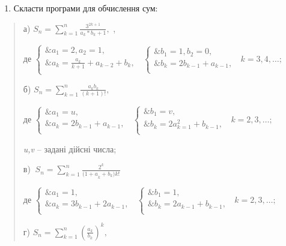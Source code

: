 \documentclass[]{article}
\begin{document}
\begin{enumerate}
\def\labelenumi{\arabic{enumi})}
\item
  \protect\hypertarget{_Hlk65241776}{}{}Скласти програми для обчислення
  сум:
\end{enumerate}

\begin{quote}
а) \(S_{n} = \sum_{k = 1}^{n}\frac{3^{2k + 1}}{a_{k}*b_{k} + 1},\) ,

де \(\left\{ \begin{matrix}
\& a_{1} = 2,a_{2} = 1, \\
\& a_{k} = \frac{a_{k}}{k + 1} + a_{k - 2} + b_{k}, \\
\end{matrix} \right.\ \) \(\left\{ \begin{matrix}
\& b_{1} = 1,b_{2} = 0, \\
\& b_{k} = 2b_{k - 1} + a_{k - 1}, \\
\end{matrix} \right.\ \) \(k = 3,4,\ldots;\)

б) \(S_{n} = \sum_{k = 1}^{n}\frac{a_{k}b_{k}}{(k + 1)!},\)

де \(\left\{ \begin{matrix}
\& a_{1} = u, \\
\& a_{k} = 2b_{k - 1} + a_{k - 1}, \\
\end{matrix} \right.\ \) \(\left\{ \begin{matrix}
\& b_{1} = v, \\
\& b_{k} = 2a_{k = 1}^{2} + b_{k - 1}, \\
\end{matrix} \right.\ \) \(k = 2,3,\ldots;\)

\emph{u,v} -- задані дійсні числа;

в)
\(\ S_{n} = \sum_{k = 1}^{n}\frac{2^{k}}{{(1 + a}_{k} + b_{k}){k!}^{}}\)

де \(\left\{ \begin{matrix}
\& a_{1} = 1, \\
\& a_{k} = 3b_{k - 1} + 2a_{k - 1}, \\
\end{matrix} \right.\ \) \(\left\{ \begin{matrix}
\& b_{1} = 1, \\
\& b_{k} = 2a_{k - 1} + b_{k - 1}, \\
\end{matrix} \right.\ \) \(k = 2,3,\ldots;\)

г) \(S_{n} = \sum_{k = 1}^{n}\left( \frac{a_{k}}{b_{k}} \right)^{k},\)


\end{quote}
\end{document}
